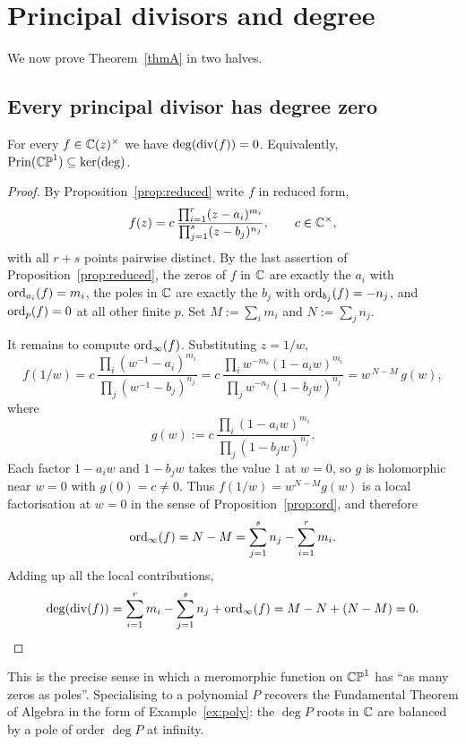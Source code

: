 \section{Principal divisors and degree}\label{sec:main}

We now prove Theorem~\ref{thmA} in two halves.

\subsection{Every principal divisor has degree zero}

\begin{smjproposition}\label{prop:degprin}
For every $f \in \mathbb{C}(z)^\times$ we have $\deg(\operatorname{div}(f)) = 0$. Equivalently,
$\operatorname{Prin}(\mathbb{CP}^1) \subseteq \ker(\deg)$.
\end{smjproposition}

\begin{proof}
By Proposition~\ref{prop:reduced} write $f$ in reduced form,
\[
f(z) = c\, \frac{\prod_{i=1}^{r}(z-a_i)^{m_i}}{\prod_{j=1}^{s}(z-b_j)^{n_j}},
\qquad c \in \mathbb{C}^\times,
\]
with all $r+s$ points pairwise distinct. By the last assertion of
Proposition~\ref{prop:reduced}, the zeros of $f$ in $\mathbb{C}$ are exactly the $a_i$
with $\operatorname{ord}_{a_i}(f) = m_i$, the poles in $\mathbb{C}$ are exactly the $b_j$ with
$\operatorname{ord}_{b_j}(f) = -n_j$, and $\operatorname{ord}_p(f) = 0$ at all other finite $p$. Set
$M := \sum_i m_i$ and $N := \sum_j n_j$.

It remains to compute $\operatorname{ord}_\infty(f)$. Substituting $z = 1/w$,
\[
f(1/w)
= c\,\frac{\prod_i (w^{-1}-a_i)^{m_i}}{\prod_j (w^{-1}-b_j)^{n_j}}
= c\,\frac{\prod_i w^{-m_i}(1-a_iw)^{m_i}}{\prod_j w^{-n_j}(1-b_jw)^{n_j}}
= w^{\,N-M}\, g(w),
\]
where
\[
g(w) := c\,\frac{\prod_i (1-a_iw)^{m_i}}{\prod_j (1-b_jw)^{n_j}} .
\]
Each factor $1 - a_i w$ and $1 - b_j w$ takes the value $1$ at $w = 0$, so $g$ is
holomorphic near $w = 0$ with $g(0) = c \neq 0$. Thus $f(1/w) = w^{N-M}g(w)$ is a
local factorisation at $w = 0$ in the sense of Proposition~\ref{prop:ord}, and
therefore
\[
\operatorname{ord}_\infty(f) = N - M = \sum_{j=1}^{s} n_j - \sum_{i=1}^{r} m_i .
\]
Adding up all the local contributions,
\[
\deg(\operatorname{div}(f)) = \sum_{i=1}^{r} m_i - \sum_{j=1}^{s} n_j + \operatorname{ord}_\infty(f)
= M - N + (N - M) = 0 . \qedhere
\]
\end{proof}

\begin{remark}
This is the precise sense in which a meromorphic function on $\mathbb{CP}^1$ has ``as many
zeros as poles''. Specialising to a polynomial $P$ recovers the Fundamental
Theorem of Algebra in the form of Example~\ref{ex:poly}: the $\deg P$ roots in
$\mathbb{C}$ are balanced by a pole of order $\deg P$ at infinity.
\end{remark}

